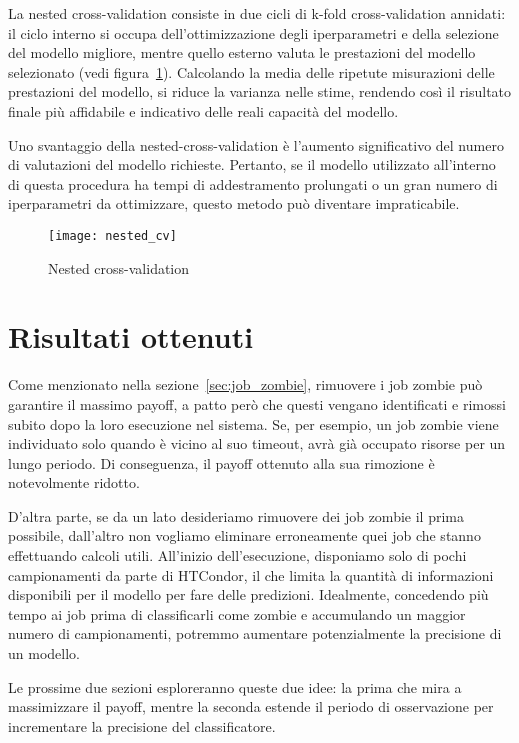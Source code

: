 La nested cross-validation consiste in due cicli di k-fold cross-validation
annidati: il ciclo interno si occupa dell'ottimizzazione degli iperparametri e
della selezione del modello migliore, mentre quello esterno valuta le
prestazioni del modello selezionato (vedi figura~\ref{fig:nested_cv}).
Calcolando la media delle ripetute misurazioni delle prestazioni del modello,
si riduce la varianza nelle stime, rendendo così il risultato finale più
affidabile e indicativo delle reali capacità del modello.

Uno svantaggio della nested-cross-validation è l'aumento significativo del
numero di valutazioni del modello richieste. Pertanto, se il modello
utilizzato all'interno di questa procedura ha tempi di addestramento
prolungati o un gran numero di iperparametri da ottimizzare, questo metodo può
diventare impraticabile.

\begin{figure}[!ht]
    \centering
    \texttt{[image: nested\_cv]}
    \caption{Nested cross-validation \protect\cite{raschka2018}}
    \label{fig:nested_cv}
\end{figure}

\section{Risultati ottenuti}

Come menzionato nella sezione~\ref{sec:job_zombie}, rimuovere i job zombie può
garantire il massimo payoff, a patto però che questi vengano identificati e
rimossi subito dopo la loro esecuzione nel sistema. Se, per esempio, un job
zombie viene individuato solo quando è vicino al suo timeout, avrà già
occupato risorse per un lungo periodo. Di conseguenza, il payoff ottenuto alla
sua rimozione è notevolmente ridotto.

D'altra parte, se da un lato desideriamo rimuovere dei job zombie il prima
possibile, dall'altro non vogliamo eliminare erroneamente quei job che stanno
effettuando calcoli utili. All'inizio dell'esecuzione, disponiamo solo di
pochi campionamenti da parte di HTCondor, il che limita la quantità di
informazioni disponibili per il modello per fare delle predizioni. Idealmente,
concedendo più tempo ai job prima di classificarli come zombie e accumulando
un maggior numero di campionamenti, potremmo aumentare potenzialmente la
precisione di un modello.

Le prossime due sezioni esploreranno queste due idee: la prima che mira a
massimizzare il payoff, mentre la seconda estende il periodo di osservazione
per incrementare la precisione del classificatore.


